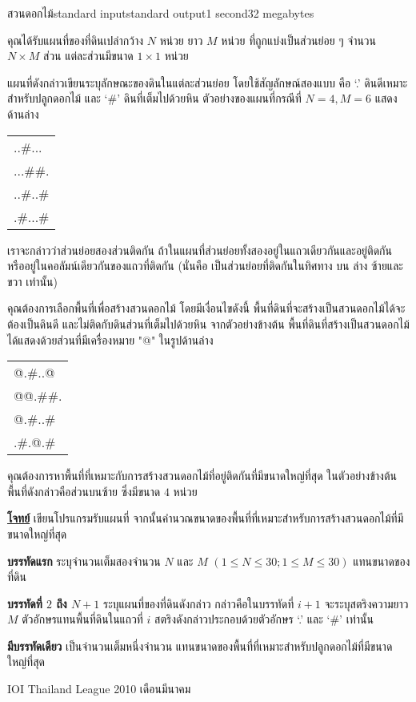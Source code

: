 \documentclass[11pt,a4paper]{article}
\begin{document}
\begin{problem}{สวนดอกไม้}{standard input}{standard output}{1 second}{32 megabytes}

คุณได้รับแผนที่ของที่ดินเปล่ากว้าง $N$ หน่วย ยาว $M$ หน่วย ที่ถูกแบ่งเป็นส่วนย่อย ๆ จำนวน $N \times M$ ส่วน แต่ละส่วนมีขนาด $1 \times 1$ หน่วย

                แผนที่ดังกล่าวเขียนระบุลักษณะของดินในแต่ละส่วนย่อย โดยใช้สัญลักษณ์สองแบบ คือ ‘.’ ดินดีเหมาะสำหรับปลูกดอกไม้ และ ‘\#’ ดินที่เต็มไปด้วยหิน  ตัวอย่างของแผนที่กรณีที่ $N = 4, M = 6$ แสดงด้านล่าง

\begin{tabular}{l}
\ttfamily ..\#...\\
\ttfamily ...\#\#.\\
\ttfamily ..\#..\#\\
\ttfamily .\#...\#\\
\end{tabular}

เราจะกล่าวว่าส่วนย่อยสองส่วนติดกัน ถ้าในแผนที่ส่วนย่อยทั้งสองอยู่ในแถวเดียวกันและอยู่ติดกัน หรืออยู่ในคอลัมน์เดียวกันของแถวที่ติดกัน  (นั่นคือ เป็นส่วนย่อยที่ติดกันในทิศทาง บน ล่าง ซ้ายและขวา เท่านั้น)

คุณต้องการเลือกพื้นที่เพื่อสร้างสวนดอกไม้ โดยมีเงื่อนไขดังนี้  พื้นที่ดินที่จะสร้างเป็นสวนดอกไม้ได้จะต้องเป็นดินดี และไม่ติดกับดินส่วนที่เต็มไปด้วยหิน   จากตัวอย่างข้างต้น พื้นที่ดินที่สร้างเป็นสวนดอกไม้ได้แสดงด้วยส่วนที่มีเครื่องหมาย "@" ในรูปด้านล่าง

\begin{tabular}{l}
\ttfamily @.\#..@\\
\ttfamily @@.\#\#.\\
\ttfamily @.\#..\#\\
\ttfamily .\#.@.\#\\
\end{tabular}

คุณต้องการหาพื้นที่ที่เหมาะกับการสร้างสวนดอกไม้ที่อยู่ติดกันที่มีขนาดใหญ่ที่สุด  ในตัวอย่างข้างต้น พื้นที่ดังกล่าวคือส่วนบนซ้าย ซึ่งมีขนาด $4$ หน่วย

\bigskip
\underline{\textbf{โจทย์}}  เขียนโปรแกรมรับแผนที่ จากนั้นคำนวณขนาดของพื้นที่ที่เหมาะสำหรับการสร้างสวนดอกไม้ที่มีขนาดใหญ่ที่สุด


\InputFile

\textbf{บรรทัดแรก} ระบุจำนวนเต็มสองจำนวน $N$ และ $M$ $(1 \leq N \leq 30; 1 \leq M \leq 30)$  แทนขนาดของที่ดิน 

\textbf{บรรทัดที่ $2$ ถึง $N+1$} ระบุแผนที่ของที่ดินดังกล่าว กล่าวคือในบรรทัดที่ $i+1$ จะระบุสตริงความยาว $M$ ตัวอักษรแทนพื้นที่ดินในแถวที่ $i$ สตริงดังกล่าวประกอบด้วยตัวอักษร ‘.’ และ ‘\#’ เท่านั้น


\OutputFile

\textbf{มีบรรทัดเดียว} เป็นจำนวนเต็มหนึ่งจำนวน แทนขนาดของพื้นที่ที่เหมาะสำหรับปลูกดอกไม้ที่มีขนาดใหญ่ที่สุด

\Examples

\begin{example}
%
\end{example}


\Source

IOI Thailand League 2010 เดือนมีนาคม

\end{problem}
\end{document}
